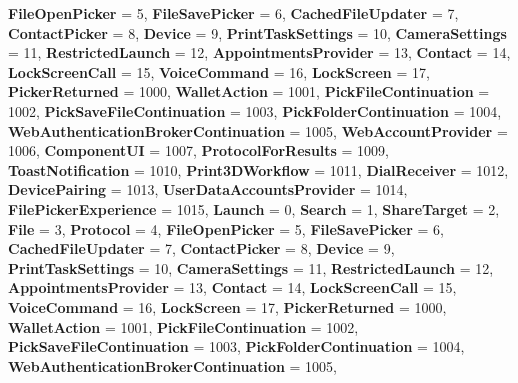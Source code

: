 \begin{DoxyCompactItemize}
{\bfseries File\+Open\+Picker} = 5, 
\newline
{\bfseries File\+Save\+Picker} = 6, 
{\bfseries Cached\+File\+Updater} = 7, 
{\bfseries Contact\+Picker} = 8, 
{\bfseries Device} = 9, 
\newline
{\bfseries Print\+Task\+Settings} = 10, 
{\bfseries Camera\+Settings} = 11, 
{\bfseries Restricted\+Launch} = 12, 
{\bfseries Appointments\+Provider} = 13, 
\newline
{\bfseries Contact} = 14, 
{\bfseries Lock\+Screen\+Call} = 15, 
{\bfseries Voice\+Command} = 16, 
{\bfseries Lock\+Screen} = 17, 
\newline
{\bfseries Picker\+Returned} = 1000, 
{\bfseries Wallet\+Action} = 1001, 
{\bfseries Pick\+File\+Continuation} = 1002, 
{\bfseries Pick\+Save\+File\+Continuation} = 1003, 
\newline
{\bfseries Pick\+Folder\+Continuation} = 1004, 
{\bfseries Web\+Authentication\+Broker\+Continuation} = 1005, 
{\bfseries Web\+Account\+Provider} = 1006, 
{\bfseries Component\+UI} = 1007, 
\newline
{\bfseries Protocol\+For\+Results} = 1009, 
{\bfseries Toast\+Notification} = 1010, 
{\bfseries Print3\+D\+Workflow} = 1011, 
{\bfseries Dial\+Receiver} = 1012, 
\newline
{\bfseries Device\+Pairing} = 1013, 
{\bfseries User\+Data\+Accounts\+Provider} = 1014, 
{\bfseries File\+Picker\+Experience} = 1015, 
{\bfseries Launch} = 0, 
\newline
{\bfseries Search} = 1, 
{\bfseries Share\+Target} = 2, 
{\bfseries File} = 3, 
{\bfseries Protocol} = 4, 
\newline
{\bfseries File\+Open\+Picker} = 5, 
{\bfseries File\+Save\+Picker} = 6, 
{\bfseries Cached\+File\+Updater} = 7, 
{\bfseries Contact\+Picker} = 8, 
\newline
{\bfseries Device} = 9, 
{\bfseries Print\+Task\+Settings} = 10, 
{\bfseries Camera\+Settings} = 11, 
{\bfseries Restricted\+Launch} = 12, 
\newline
{\bfseries Appointments\+Provider} = 13, 
{\bfseries Contact} = 14, 
{\bfseries Lock\+Screen\+Call} = 15, 
{\bfseries Voice\+Command} = 16, 
\newline
{\bfseries Lock\+Screen} = 17, 
{\bfseries Picker\+Returned} = 1000, 
{\bfseries Wallet\+Action} = 1001, 
{\bfseries Pick\+File\+Continuation} = 1002, 
\newline
{\bfseries Pick\+Save\+File\+Continuation} = 1003, 
{\bfseries Pick\+Folder\+Continuation} = 1004, 
{\bfseries Web\+Authentication\+Broker\+Continuation} = 1005, 

\end{DoxyCompactItemize}

